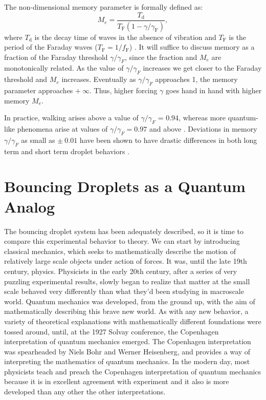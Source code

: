 The non-dimensional memory parameter is formally defined as:
$$M_e = \frac{T_\mathrm{d}}{T_\mathrm{F}(1-\gamma/\gamma_\mathrm{F})},$$
where $T_\mathrm{d}$ is the decay time of waves in the absence of vibration and $T_\mathrm{F}$ is the period of the Faraday waves ($T_\mathrm{F} = 1/f_\mathrm{F}$) . It will suffice to discuss memory as a fraction of the Faraday threshold $\gamma/\gamma_{F}$, since the fraction and $M_e$ are monotonically related. As the value of $\gamma/\gamma_{F}$ increases we get closer to the Faraday threshold and $M_e$ increases. Eventually as $\gamma/\gamma_{F}$ approaches 1, the memory parameter approaches $+~\infty$. Thus, higher forcing $\gamma$ goes hand in hand with higher memory $M_e$. 

In practice, walking arises above a value of $\gamma/\gamma_{F}$ = 0.94, whereas more quantum-like phenomena arise at values of $\gamma/\gamma_{F} = 0.97$ and above . Deviations in memory $\gamma/\gamma_{F}$ as small as $\pm~0.01$ have been shown to have drastic differences in both long term and short term droplet behaviors .
            
            
\section{Bouncing Droplets as a Quantum Analog}   

The bouncing droplet system has been adequately described, so it is time to compare this experimental behavior to theory. We can start by introducing classical mechanics, which seeks to mathematically describe the motion of relatively large scale objects under action of forces. It was, until the late 19th century, physics. Physicists in the early 20th century, after a series of very puzzling experimental results, slowly began to realize that matter at the small scale behaved very differently than what they'd been studying in macroscale world. Quantum mechanics was developed, from the ground up, with the aim of mathematically describing this brave new world. As with any new behavior, a variety of theoretical explanations with mathematically different foundations were tossed around, until, at the 1927 Solvay conference, the Copenhagen interpretation of quantum mechanics emerged. The Copenhagen interpretation was spearheaded by Niels Bohr and Werner Heisenberg, and provides a way of interpreting the mathematics of quantum mechanics. In the modern day, most physicists teach and preach the Copenhagen interpretation of quantum mechanics because it is in excellent agreement with experiment and it also is more developed than any other the other interpretations.

